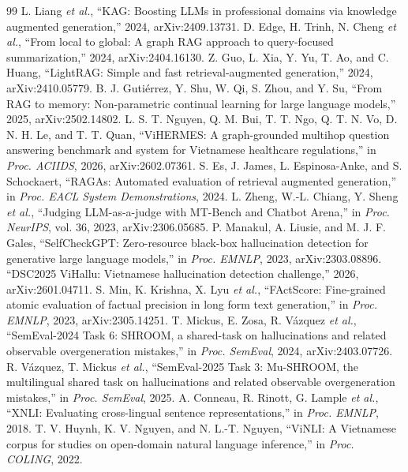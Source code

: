\documentclass[conference]{IEEEtran}
\begin{document}
\begin{thebibliography}{99}
 L. Liang \emph{et al.}, ``KAG: Boosting LLMs in professional domains via knowledge augmented generation,'' 2024, arXiv:2409.13731.
 D. Edge, H. Trinh, N. Cheng \emph{et al.}, ``From local to global: A graph RAG approach to query-focused summarization,'' 2024, arXiv:2404.16130.
 Z. Guo, L. Xia, Y. Yu, T. Ao, and C. Huang, ``LightRAG: Simple and fast retrieval-augmented generation,'' 2024, arXiv:2410.05779.
 B. J. Guti\'errez, Y. Shu, W. Qi, S. Zhou, and Y. Su, ``From RAG to memory: Non-parametric continual learning for large language models,'' 2025, arXiv:2502.14802.
 L. S. T. Nguyen, Q. M. Bui, T. T. Ngo, Q. T. N. Vo, D. N. H. Le, and T. T. Quan, ``ViHERMES: A graph-grounded multihop question answering benchmark and system for Vietnamese healthcare regulations,'' in \emph{Proc. ACIIDS}, 2026, arXiv:2602.07361.
 S. Es, J. James, L. Espinosa-Anke, and S. Schockaert, ``RAGAs: Automated evaluation of retrieval augmented generation,'' in \emph{Proc. EACL System Demonstrations}, 2024.
 L. Zheng, W.-L. Chiang, Y. Sheng \emph{et al.}, ``Judging LLM-as-a-judge with MT-Bench and Chatbot Arena,'' in \emph{Proc. NeurIPS}, vol. 36, 2023, arXiv:2306.05685.
 P. Manakul, A. Liusie, and M. J. F. Gales, ``SelfCheckGPT: Zero-resource black-box hallucination detection for generative large language models,'' in \emph{Proc. EMNLP}, 2023, arXiv:2303.08896.
 ``DSC2025 ViHallu: Vietnamese hallucination detection challenge,'' 2026, arXiv:2601.04711.
 S. Min, K. Krishna, X. Lyu \emph{et al.}, ``FActScore: Fine-grained atomic evaluation of factual precision in long form text generation,'' in \emph{Proc. EMNLP}, 2023, arXiv:2305.14251.
 T. Mickus, E. Zosa, R. V\'azquez \emph{et al.}, ``SemEval-2024 Task 6: SHROOM, a shared-task on hallucinations and related observable overgeneration mistakes,'' in \emph{Proc. SemEval}, 2024, arXiv:2403.07726.
 R. V\'azquez, T. Mickus \emph{et al.}, ``SemEval-2025 Task 3: Mu-SHROOM, the multilingual shared task on hallucinations and related observable overgeneration mistakes,'' in \emph{Proc. SemEval}, 2025.
 A. Conneau, R. Rinott, G. Lample \emph{et al.}, ``XNLI: Evaluating cross-lingual sentence representations,'' in \emph{Proc. EMNLP}, 2018.
 T. V. Huynh, K. V. Nguyen, and N. L.-T. Nguyen, ``ViNLI: A Vietnamese corpus for studies on open-domain natural language inference,'' in \emph{Proc. COLING}, 2022.

\end{thebibliography}
\end{document}
